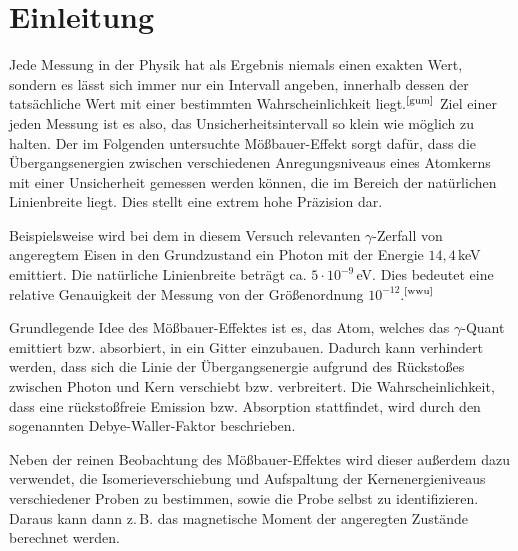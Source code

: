 \section{Einleitung}

Jede Messung in der Physik hat als Ergebnis niemals einen exakten Wert, sondern es lässt sich immer nur ein Intervall angeben, innerhalb dessen der tatsächliche Wert mit einer bestimmten Wahrscheinlichkeit liegt.$^\text{\cite{gum}}$ Ziel einer jeden Messung ist es also, das Unsicherheitsintervall so klein wie möglich zu halten. Der im Folgenden untersuchte Mößbauer-Effekt sorgt dafür, dass die Übergangsenergien zwischen verschiedenen Anregungsniveaus eines Atomkerns mit einer Unsicherheit gemessen werden können, die im Bereich der natürlichen Linienbreite liegt. Dies stellt eine extrem hohe Präzision dar. 

Beispielsweise wird bei dem in diesem Versuch relevanten $\gamma$-Zerfall von angeregtem Eisen in den Grundzustand ein Photon mit der Energie $14,4\,$keV emittiert. Die natürliche Linienbreite beträgt ca. $5\cdot 10^{-9}\,$eV. Dies bedeutet eine relative Genauigkeit der Messung von der Größenordnung $10^{-12}$.$^\text{\cite{wwu}}$ 

Grundlegende Idee des Mößbauer-Effektes ist es, das Atom, welches das $\gamma$-Quant emittiert bzw. absorbiert, in ein Gitter einzubauen. Dadurch kann verhindert werden, dass sich die Linie der Übergangsenergie aufgrund des Rückstoßes zwischen Photon und Kern verschiebt bzw. verbreitert. Die Wahrscheinlichkeit, dass eine rückstoßfreie Emission bzw. Absorption stattfindet, wird durch den sogenannten Debye-Waller-Faktor beschrieben.

Neben der reinen Beobachtung des Mößbauer-Effektes wird dieser außerdem dazu verwendet, die Isomerieverschiebung und Aufspaltung der Kernenergieniveaus verschiedener Proben zu bestimmen, sowie die Probe selbst zu identifizieren. Daraus kann dann z.\,B. das magnetische Moment der angeregten Zustände berechnet werden.



